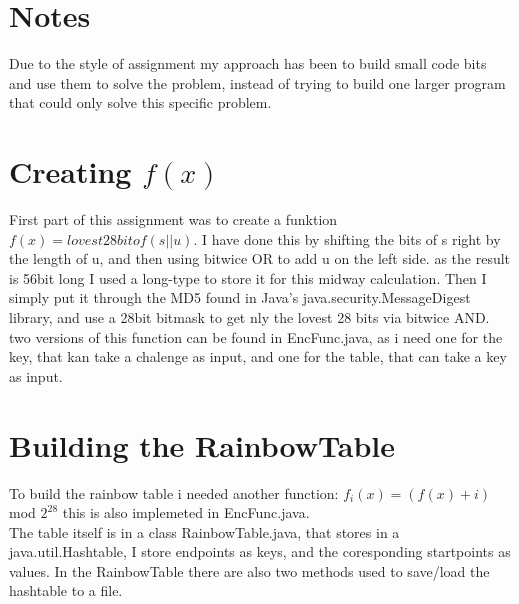 \section*{Notes}
Due to the style of assignment my approach has been to build small code bits and
use them to solve the problem, instead of trying to build one larger program
that could only solve this specific problem.
\section*{Creating $f(x)$}
First part of this assignment was to create a funktion $f(x) = lovest 28bit of
(s||u)$. I have done this by shifting the bits of s right by the length of u,
and then using bitwice OR to add u on the left side. as the result is 56bit long
I used a long-type to store it for this midway calculation. Then I simply put it
through the MD5 found in Java's java.security.MessageDigest library, and use a
28bit bitmask to get nly the lovest 28 bits via bitwice AND.\\
two versions of this function can be found in EncFunc.java, as i need one for
the key, that kan take a chalenge as input, and one for the table, that can take a
key as input.

\section*{Building the RainbowTable}
To build the rainbow table i needed another function: $f_i(x)=(f(x) + i)$ mod
$2^{28}$ this is also implemeted in EncFunc.java.\\
The table itself is in a class RainbowTable.java, that stores in a
java.util.Hashtable, I store endpoints as keys, and the coresponding startpoints
as values. In the RainbowTable there are also two methods used to save/load the
hashtable to a file.

